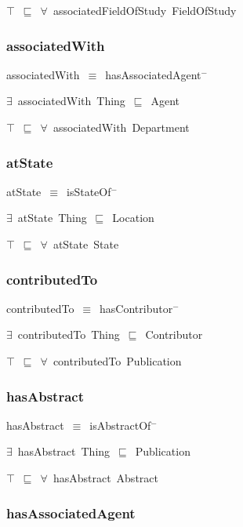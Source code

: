 \documentclass{article}
\begin{document}
\ensuremath{\top}~\ensuremath{\sqsubseteq}~\ensuremath{\forall}~associatedFieldOfStudy~FieldOfStudy

\subsubsection*{associatedWith}

associatedWith~\ensuremath{\equiv}~hasAssociatedAgent\ensuremath{^-}

\ensuremath{\exists}~associatedWith~Thing~\ensuremath{\sqsubseteq}~Agent

\ensuremath{\top}~\ensuremath{\sqsubseteq}~\ensuremath{\forall}~associatedWith~Department

\subsubsection*{atState}

atState~\ensuremath{\equiv}~isStateOf\ensuremath{^-}

\ensuremath{\exists}~atState~Thing~\ensuremath{\sqsubseteq}~Location

\ensuremath{\top}~\ensuremath{\sqsubseteq}~\ensuremath{\forall}~atState~State

\subsubsection*{contributedTo}

contributedTo~\ensuremath{\equiv}~hasContributor\ensuremath{^-}

\ensuremath{\exists}~contributedTo~Thing~\ensuremath{\sqsubseteq}~Contributor

\ensuremath{\top}~\ensuremath{\sqsubseteq}~\ensuremath{\forall}~contributedTo~Publication

\subsubsection*{hasAbstract}

hasAbstract~\ensuremath{\equiv}~isAbstractOf\ensuremath{^-}

\ensuremath{\exists}~hasAbstract~Thing~\ensuremath{\sqsubseteq}~Publication

\ensuremath{\top}~\ensuremath{\sqsubseteq}~\ensuremath{\forall}~hasAbstract~Abstract

\subsubsection*{hasAssociatedAgent}
\end{document}

